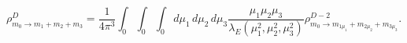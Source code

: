 \begin{equation}
 \rho^{D}_{m_0\rightarrow m_1+m_2+m_3}\!=\frac{1}{4\pi^3}
 \int_0\!\!\int_0\!\!\int_0 \!\!d\mu_1\,d\mu_2\,d\mu_3
 \frac{\mu_1\mu_2\mu_3}{\lambda_E(\mu_1^2,\mu_2^2,\mu_3^2)}
 \rho^{D-2}_{m_0\rightarrow m_{1\mu_1}+m_{2\mu_2}+m_{3\mu_3}}.
\end{equation}

